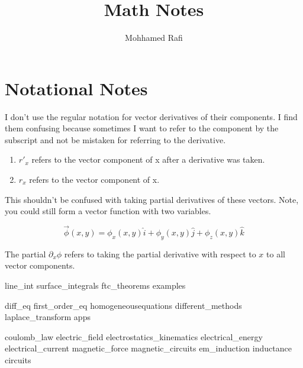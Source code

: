 \documentclass[oneside]{mathnotes}
\title{Math Notes}
\author{Mohhamed Rafi}
\begin{document}
	\maketitle
	\tableofcontents\thispagestyle{fancy}
	\pagebreak

	\section*{Notational Notes}
	I don't use the regular notation for vector derivatives of their components. I find them confusing because sometimes I want to refer to the component by the subscript and not be mistaken for referring to the derivative.

	\begin{enumerate}
	\item $r'_x$ refers to the vector component of x after a derivative was taken.
	\item $r_x$ refers to the vector component of x.
	\end{enumerate}
	This shouldn't be confused with taking partial derivatives of these vectors. Note, you could still form a vector function with two variables. 

	\begin{equation*}
		\vec{\phi}(x,y) = \phi_x(x,y)\hat{i} + \phi_y(x,y)\hat{j} + \phi_z(x,y)\hat{k}
	\end{equation*}

	The partial $\partial_x\phi$ refers to taking the partial derivative with respect to $x$ to all vector components.


	{line_int}
	{surface_integrals}
	{ftc_theorems}
	{examples}
	
	{diff_eq}
	{first_order_eq}
	{homogeneousequations}
	{different_methods}
	{laplace_transform}
	{apps}
	
	{coulomb_law}
	{electric_field}
	{electrostatics_kinematics}
	{electrical_energy}
	{electrical_current}
	{magnetic_force}
	{magnetic_circuits}
	{em_induction}
	{inductance}
	{circuits}
\end{document}
